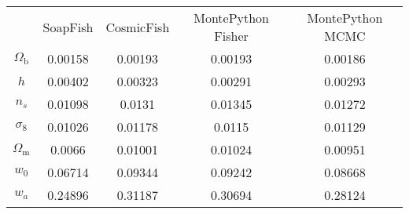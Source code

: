 \begin{table}
\centering
\begin{tabular}{|c|c|c|c|c|}
 & SoapFish & CosmicFish & MontePython Fisher & MontePython MCMC \\
$\Omega_\mathrm{b}$ & 0.00158 & 0.00193 & 0.00193 & 0.00186 \\
$h$ & 0.00402 & 0.00323 & 0.00291 & 0.00293 \\
$n_s$ & 0.01098 & 0.0131 & 0.01345 & 0.01272 \\
$\sigma_8$ & 0.01026 & 0.01178 & 0.0115 & 0.01129 \\
$\Omega_\mathrm{m}$ & 0.0066 & 0.01001 & 0.01024 & 0.00951 \\
$w_0$ & 0.06714 & 0.09344 & 0.09242 & 0.08668 \\
$w_a$ & 0.24896 & 0.31187 & 0.30694 & 0.28124 \\
\end{tabular}
\end{table}
